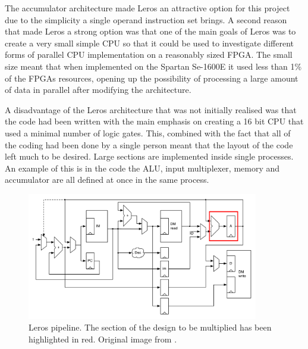 The accumulator architecture made Leros an attractive option for this project due to 
the simplicity a single operand instruction set brings. A second reason that made Leros 
a strong option was that one of the main goals of Leros was to create a very small simple 
CPU so that it could be used to investigate different forms of parallel CPU implementation 
on a reasonably sized FPGA. The small size meant that when implemented on the Spartan 
Se-1600E it used less than 1\% of the FPGAs resources, opening up the possibility of
processing a large amount of data in parallel after modifying the architecture.

A disadvantage of the Leros architecture that was not initially realised was that the 
code had been written with the main emphasis on creating a 16 bit CPU that used a minimal 
number of logic gates. This, combined with the fact that all of the coding had been done 
by a single person meant that the layout of the code left much to be desired. Large sections 
are implemented inside single processes. An example of this is in the code the ALU, input 
multiplexer, memory and accumulator are all defined at once in the same process.
 
\begin{figure}[h]
\center
\includegraphics[width=0.9\textwidth]{images/leros-system}
\caption{Leros pipeline. The section of the design to be multiplied has been
highlighted in red. Original image from \cite{schoeberlleros}.
}
\label{fig:leros-system}
\end{figure}
